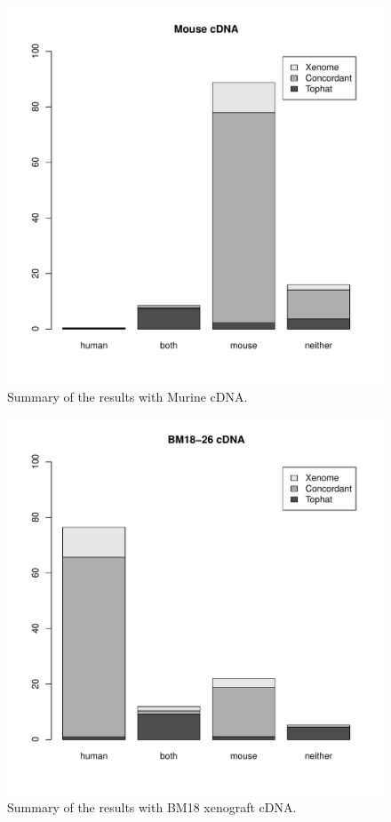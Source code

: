 \documentclass{bioinfo}
\begin{document}
\begin{figure}
\includegraphics[scale=0.5]{mouse.pdf}
\caption{Summary of the results with Murine cDNA.}
\label{fig:mouse}
\end{figure}

\begin{figure}
\includegraphics[scale=0.5]{bm18-26.pdf}
\caption{Summary of the results with BM18 xenograft cDNA.}
\label{fig:bm18-26}
\end{figure}
\end{document}
